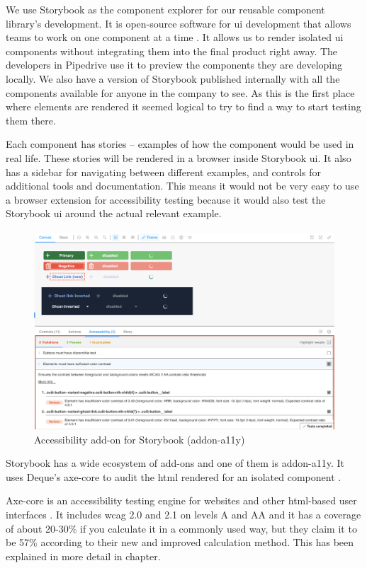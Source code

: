 \documentclass{master_thesis}
\begin{document}
We use Storybook as the component explorer for our reusable component library's development. It is open-source software for \ac{ui} development that allows teams to work on one component at a time \citep{storybook}. It allows us to render isolated \ac{ui} components without integrating them into the final product right away. The developers in Pipedrive use it to preview the components they are developing locally. We also have a version of Storybook published internally with all the components available for anyone in the company to see. As this is the first place where elements are rendered it seemed logical to try to find a way to start testing them there.

Each component has stories – examples of how the component would be used in real life. These stories will be rendered in a browser inside Storybook \ac{ui}. It also has a sidebar for navigating between different examples, and controls for additional tools and documentation. This means it would not be very easy to use a browser extension for accessibility testing because it would also test the Storybook \ac{ui} around the actual relevant example.

\begin{figure}[H]
	\includegraphics[width=\textwidth]{img/addon-a11y.png}
	\caption{Accessibility add-on for Storybook (addon-a11y)}
	\label{fig:addon-a11y}
\end{figure}

Storybook has a wide ecosystem of add-ons and one of them is addon-a11y. It uses Deque's axe-core to audit the \ac{html} rendered for an isolated component \citep{addon-a11y}.

Axe-core is an accessibility testing engine for websites and other \ac{html}-based user interfaces \citep{Deque2023}. It includes \ac{wcag} 2.0 and 2.1 on levels A and AA and it has a coverage of about 20-30\% if you calculate it in a commonly used way, but they claim it to be 57\% according to their new and improved calculation method. This has been explained in more detail in  chapter.
\end{document}
